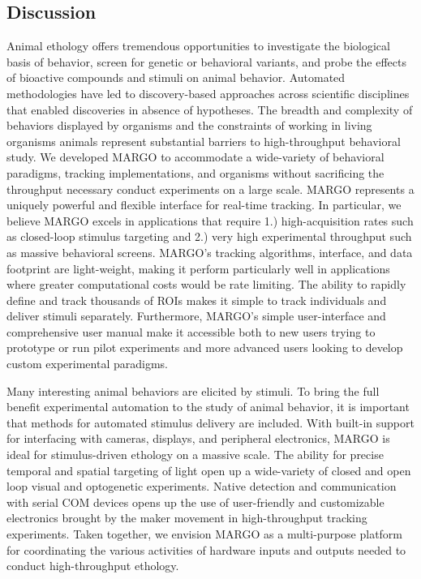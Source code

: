 \documentclass[10pt]{article}
\begin{document}
\begin{multicols}{2}
\section*{Discussion}

Animal ethology offers tremendous opportunities to investigate the biological basis of behavior, screen for genetic or behavioral variants, and probe the effects of bioactive compounds and stimuli on animal behavior. Automated methodologies have led to discovery-based approaches across scientific disciplines that enabled discoveries in absence of hypotheses. The breadth and complexity of behaviors displayed by organisms and the constraints of working in living organisms animals represent substantial barriers to high-throughput behavioral study. We developed MARGO to accommodate a wide-variety of behavioral paradigms, tracking implementations, and organisms without sacrificing the throughput necessary conduct experiments on a large scale. MARGO represents a uniquely powerful and flexible interface for real-time tracking. In particular, we believe MARGO excels in applications that require 1.) high-acquisition rates such as closed-loop stimulus targeting and 2.) very high experimental throughput such as massive behavioral screens. MARGO's tracking algorithms, interface, and data footprint are light-weight, making it perform particularly well in applications where greater computational costs would be rate limiting. The ability to rapidly define and track thousands of ROIs makes it simple to track individuals and deliver stimuli separately. Furthermore, MARGO's simple user-interface and comprehensive user manual make it accessible both to new users trying to prototype or run pilot experiments and more advanced users looking to develop custom experimental paradigms.

Many interesting animal behaviors are elicited by stimuli. To bring the full benefit experimental automation to the study of animal behavior, it is important that methods for automated stimulus delivery are included. With built-in support for interfacing with cameras, displays, and peripheral electronics, MARGO is ideal for stimulus-driven ethology on a massive scale. The ability for precise temporal and spatial targeting of light open up a wide-variety of closed and open loop visual and optogenetic experiments. Native detection and communication with serial COM devices opens up the use of user-friendly and customizable electronics brought by the maker movement in high-throughput tracking experiments. Taken together, we envision MARGO as a multi-purpose platform for coordinating the various activities of hardware inputs and outputs needed to conduct high-throughput ethology. 


\end{multicols}
\end{document}

